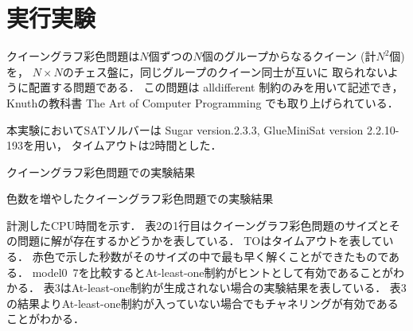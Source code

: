 \section{実行実験}
クイーングラフ彩色問題は$N$個ずつの$N$個のグループからなるクイーン (計$N^2$個) を，
$N\times N$のチェス盤に，同じグループのクイーン同士が互いに
取られないように配置する問題である．
この問題は alldifferent 制約のみを用いて記述でき， Knuthの教科書 The Art of Computer Programming でも取り上げられている．

本実験においてSATソルバーは Sugar version.2.3.3, GlueMiniSat version 2.2.10-193を用い，
タイムアウトは2時間とした．

\begin{table}[h]
    \caption{クイーングラフ彩色問題での実験結果}
    \label{table:result}
    {\scriptsize }
\end{table}

\begin{table}[h]
    \caption{色数を増やしたクイーングラフ彩色問題での実験結果}
    \label{table:result_c}
    {\scriptsize }
\end{table}
計測したCPU時間を示す．
表2の1行目はクイーングラフ彩色問題のサイズとその問題に解が存在するかどうかを表している．
TOはタイムアウトを表している．
赤色で示した秒数がそのサイズの中で最も早く解くことができたものである．
model0~7を比較するとAt-least-one制約がヒントとして有効であることがわかる．
表3はAt-least-one制約が生成されない場合の実験結果を表している．
表3の結果よりAt-least-one制約が入っていない場合でもチャネリングが有効であることがわかる．

